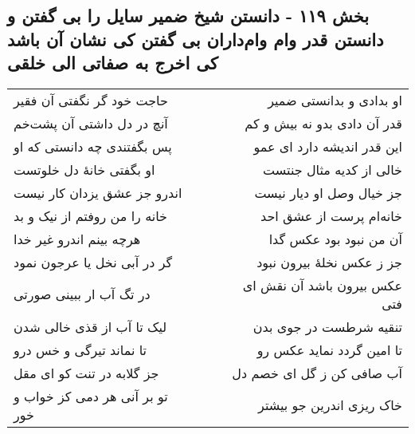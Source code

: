 \begin{center}
\section*{بخش ۱۱۹ - دانستن شیخ ضمیر سایل را بی گفتن و دانستن قدر وام وام‌داران  بی گفتن کی نشان آن باشد کی اخرج به صفاتی الی خلقی}
\label{sec:sh119}
\begin{longtable}{l p{0.5cm} r}
حاجت خود گر نگفتی آن فقیر
&&
او بدادی و بدانستی ضمیر
\\
آنچ در دل داشتی آن پشت‌خم
&&
قدر آن دادی بدو نه بیش و کم
\\
پس بگفتندی چه دانستی که او
&&
این قدر اندیشه دارد ای عمو
\\
او بگفتی خانهٔ دل خلوتست
&&
خالی از کدیه مثال جنتست
\\
اندرو جز عشق یزدان کار نیست
&&
جز خیال وصل او دیار نیست
\\
خانه را من روفتم از نیک و بد
&&
خانه‌ام پرست از عشق احد
\\
هرچه بینم اندرو غیر خدا
&&
آن من نبود بود عکس گدا
\\
گر در آبی نخل یا عرجون نمود
&&
جز ز عکس نخلهٔ بیرون نبود
\\
در تگ آب ار ببینی صورتی
&&
عکس بیرون باشد آن نقش ای فتی
\\
لیک تا آب از قذی خالی شدن
&&
تنقیه شرطست در جوی بدن
\\
تا نماند تیرگی و خس درو
&&
تا امین گردد نماید عکس رو
\\
جز گلابه در تنت کو ای مقل
&&
آب صافی کن ز گل ای خصم دل
\\
تو بر آنی هر دمی کز خواب و خور
&&
خاک ریزی اندرین جو بیشتر
\\
\end{longtable}
\end{center}
